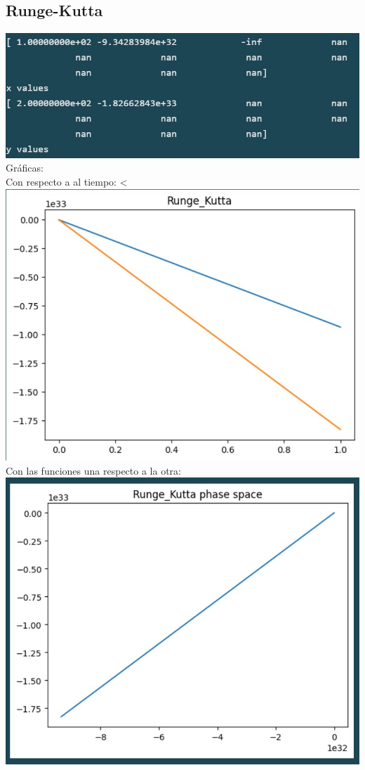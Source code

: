 \documentclass{article}
\begin{document}
           \subsection*{Runge-Kutta}
              \includegraphics{valores de runge kutta para x=100 y y=200jpg.jpg}
            \\Gráficas:\\  
               Con respecto a al tiempo:           
            <\includegraphics{Grafica runge_kutta.jpg}
               Con las funciones una respecto a la otra:
               \includegraphics{x_y_rungekutta.jpg}
\end{document}
